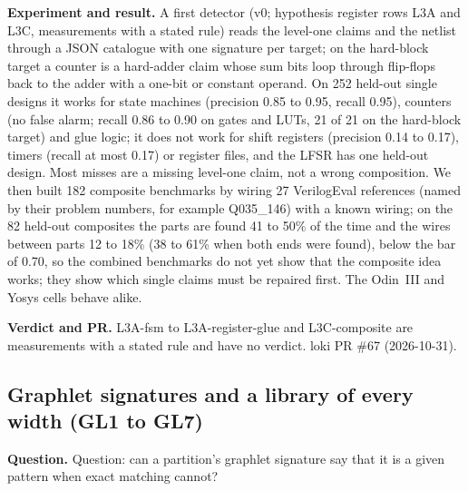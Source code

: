 \documentclass[conference]{IEEEtran}
\newcommand{\hev}[1]{\par\smallskip\noindent\textbf{#1}}
\begin{document}
\hev{Experiment and result.} A first detector (v0; hypothesis register rows L3A and L3C, measurements with a stated rule) reads the level-one claims and
the netlist through a JSON catalogue with one signature per target; on the hard-block target a counter is a hard-adder
claim whose sum bits loop through flip-flops back to the adder with a one-bit or constant operand. On 252 held-out single
designs it works for state machines (precision 0.85 to 0.95, recall 0.95), counters (no false alarm; recall 0.86 to 0.90 on
gates and LUTs, 21 of 21 on the hard-block target) and glue logic; it does not work for shift registers (precision 0.14 to
0.17), timers (recall at most 0.17) or register files, and the LFSR has one held-out design. Most misses are a missing
level-one claim, not a wrong composition. We then built 182 composite benchmarks by wiring 27 VerilogEval references
(named by their problem numbers, for example Q035\_146) with a known wiring; on the 82 held-out composites the parts are
found 41 to 50\% of the time and the wires between parts 12 to 18\% (38 to 61\% when both ends were found), below the bar of
0.70, so the combined benchmarks do not yet show that the composite idea works; they show which single claims must be
repaired first. The Odin~III and Yosys cells behave alike.

\hev{Verdict and PR.} L3A-fsm to L3A-register-glue and L3C-composite are measurements with a stated rule and have no verdict. loki PR \#67 (2026-10-31).

\subsection{Graphlet signatures and a library of every width (GL1 to GL7)}
\label{rec:graphlets}

\hev{Question.} Question: can a partition's graphlet signature say that it is a given pattern when exact matching cannot?
\end{document}
